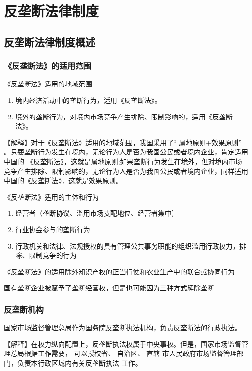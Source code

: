 \documentclass[UTF8,12pt]{ctexart}
\numberwithin{equation}{section} %
\numberwithin{figure}{section}
\numberwithin{table}{section}
\begin{document}
	\newpage
	\section{反垄断法律制度}
	
	\subsection{反垄断法律制度概述}
	
	\subsubsection{ 《反垄断法》的适用范围}
	《反垄断法》适用的地域范围
	\begin{enumerate}
		\item 境内经济活动中的垄断行为，适用《反垄断法》。
		
		\item 境外的垄断行为，对境内市场竞争产生排除、限制影响的，适用《反垄断法》。
	\end{enumerate}
	【解释】对于《反垄断法》适用的地域范围，我国采用了“ 属地原则+效果原则” 。只要垄断行为发生在境内，无论行为人是否为我国公民或者境内企业，肯定适用中国的 《反垄断法》，这就是属地原则;如果垄断行为发生在境外，但对境内市场竞争产生排除、限制影响的，无论行为人是否为我国公民或者境内企业，同样适用中国的《反垄断法》，这就是效果原则。
	
	《反垄断法》适用的主体和行为
	\begin{enumerate}
		\item 经营者（垄断协议、滥用市场支配地位、经营者集中）
		
		\item 行业协会参与的垄断行为
		
		\item 行政机关和法律、法规授权的具有管理公共事务职能的组织滥用行政权力，排除、限制竞争的行为
	\end{enumerate}
	 《反垄断法》的适用除外知识产权的正当行使和农业生产中的联合或协同行为
	
	国有垄断企业被赋予了垄断经营权，但是也可能因为三种方式解除垄断
	
	\subsubsection{反垄断机构}
	国家市场监督管理总局作为国务院反垄断执法机构，负责反垄断法的行政执法。
	
	
	【解释】在权力纵向配置上，反垄断执法权属于中央事权。但是，国家市场监督管理总局根据工作需要， 可以授权省、 自治区、 直辖 市人民政府市场监督管理部门，负责本行政区域内有关反垄断执法 工作。
	
\end{document}
